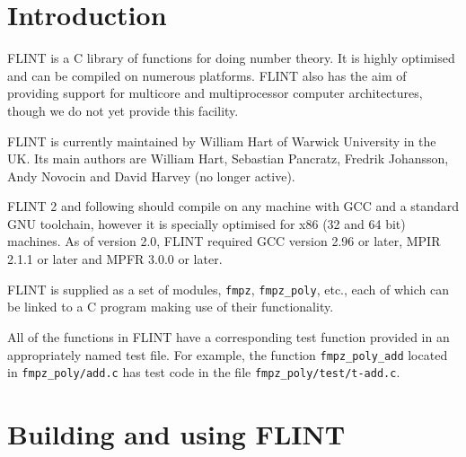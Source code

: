 \documentclass[a4paper,10pt]{book}
\newcommand{\code}{\lstinline}
\begin{document}

\frontmatter


\clearpage

\tableofcontents


\mainmatter

\chapter{Introduction}

FLINT is a C library of functions for doing number theory. It is highly 
optimised and can be compiled on numerous platforms.  FLINT also has the 
aim of providing support for multicore and multiprocessor computer 
architectures, though we do not yet provide this facility.

FLINT is currently maintained by William Hart of Warwick University in 
the UK. Its main authors are William Hart, Sebastian Pancratz, Fredrik
Johansson, Andy Novocin and David Harvey (no longer active).

FLINT 2 and following should compile on any machine with GCC and a standard 
GNU toolchain, however it is specially optimised for x86 (32 and 64 bit)
machines. As of version 2.0, FLINT required GCC version 2.96 or later, 
MPIR 2.1.1 or later and MPFR 3.0.0 or later.

FLINT is supplied as a set of modules, \code{fmpz}, \code{fmpz_poly}, etc., 
each of which can be linked to a C program making use of their functionality.

All of the functions in FLINT have a corresponding test function provided 
in an appropriately named test file.  For example, the function 
\code{fmpz_poly_add} located in \code{fmpz_poly/add.c} has test code in the 
file \code{fmpz_poly/test/t-add.c}.

\chapter{Building and using FLINT}
\end{document}
